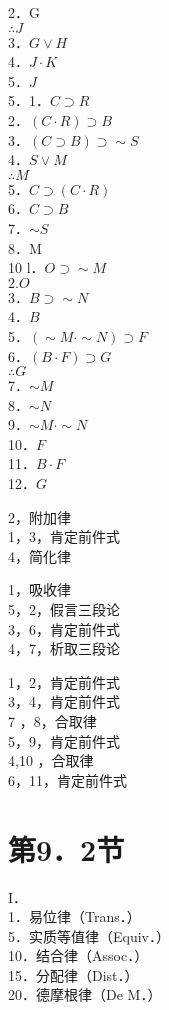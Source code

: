 2．G\\
$\therefore J$\\
3．$G \vee H$\\
4．$J \cdot K$\\
5．$J$\\
5．1．$C \supset R$\\
2．$(C \cdot R) \supset B$\\
3．$(C \supset B) \supset \sim S$\\
4．$S \vee M$\\
$\therefore M$\\
5．$C \supset(C \cdot R)$\\
6．$C \supset B$\\
7．$\sim S$\\
8．M\\
10 l．$O \supset \sim M$\\
$2 . O$\\
3．$B \supset \sim N$\\
4．$B$\\
5．$(\sim M \cdot \sim N) \supset F$\\
6．$(B \cdot F) \supset G$\\
$\therefore G$\\
7．$\sim M$\\
8．$\sim N$\\
9．$\sim M \cdot \sim N$\\
10．$F$\\
11．$B \cdot F$\\
12．$G$

2，附加律\\
1，3，肯定前件式\\
4，简化律

1，吸收律\\
5，2，假言三段论\\
3，6，肯定前件式\\
4，7，析取三段论

1，2，肯定前件式\\
3，4，肯定前件式\\
7 ，8，合取律\\
5，9，肯定前件式\\
4,10 ，合取律\\
6，11，肯定前件式

\section*{第9．2节}
I．\\
1．易位律（Trans．）\\
5．实质等值律（Equiv．）\\
10．结合律（Assoc．）\\
15．分配律（Dist．）\\
20．德摩根律（De M．）


